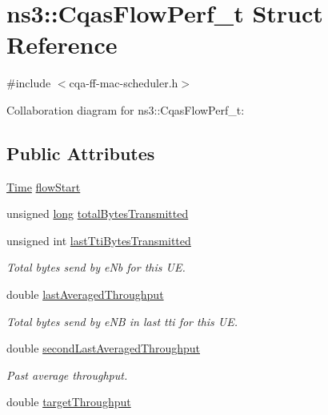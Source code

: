 \hypertarget{structns3_1_1CqasFlowPerf__t}{}\section{ns3\+:\+:Cqas\+Flow\+Perf\+\_\+t Struct Reference}
\label{structns3_1_1CqasFlowPerf__t}


{\ttfamily \#include $<$cqa-\/ff-\/mac-\/scheduler.\+h$>$}



Collaboration diagram for ns3\+:\+:Cqas\+Flow\+Perf\+\_\+t\+:
\subsection*{Public Attributes}
\begin{DoxyCompactItemize}
\item 
\hyperlink{classns3_1_1Time}{Time} \hyperlink{structns3_1_1CqasFlowPerf__t_a5ae2bde0cf5059f6bcbb7871f0c1dcc7}{flow\+Start}
\item 
unsigned \hyperlink{generate__test__data__lte__sinr_8m_a0eab6be67e93c3411f7a8b53cc297285}{long} \hyperlink{structns3_1_1CqasFlowPerf__t_abdf619f3bb7ee6637e10ebc63add398b}{total\+Bytes\+Transmitted}
\item 
unsigned int \hyperlink{structns3_1_1CqasFlowPerf__t_a7e0b80e8566c58f757542c23fb35a2dd}{last\+Tti\+Bytes\+Transmitted}
\begin{DoxyCompactList}\small\item\em Total bytes send by e\+Nb for this UE. \end{DoxyCompactList}\item 
double \hyperlink{structns3_1_1CqasFlowPerf__t_a3f95a06a46bf4b42a598f397ac98c644}{last\+Averaged\+Throughput}
\begin{DoxyCompactList}\small\item\em Total bytes send by e\+NB in last tti for this UE. \end{DoxyCompactList}\item 
double \hyperlink{structns3_1_1CqasFlowPerf__t_a56f64fb7011f9b6d395803a9a70a0276}{second\+Last\+Averaged\+Throughput}
\begin{DoxyCompactList}\small\item\em Past average throughput. \end{DoxyCompactList}\item 
double \hyperlink{structns3_1_1CqasFlowPerf__t_a59a4f50ec37c798c1163f07d23a8a84a}{target\+Throughput}
\end{DoxyCompactItemize}


